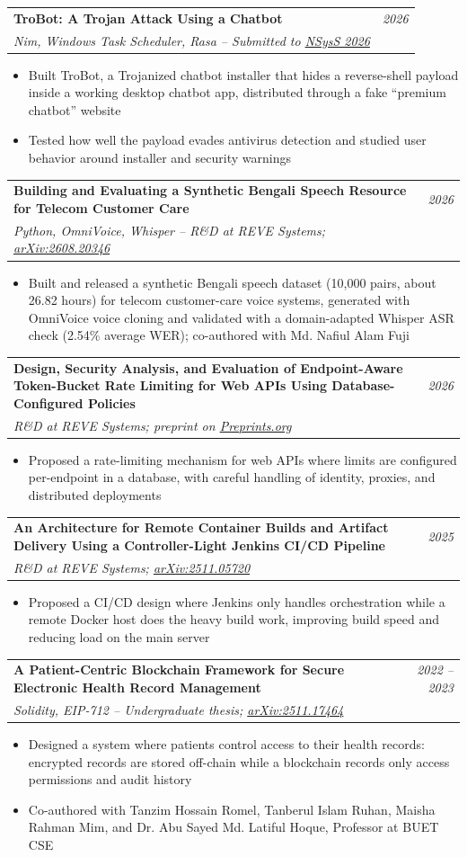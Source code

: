 \documentclass[a4paper,11pt]{article}
\makeatletter
\newcommand{\resumeProject}[4]{
\vspace{0.5mm}\item
    \begin{tabular*}{0.98\textwidth}[t]{@{}p{0.80\textwidth}@{\extracolsep{\fill}}r@{}}
        \textbf{#1} & \textit{\footnotesize{#3}} \\
        \footnotesize{\textit{#2}} & \footnotesize{#4}
    \end{tabular*}
    \vspace{-2.4mm}
}
\newcommand{\resumeItemListStart}{\begin{itemize}[leftmargin=*,labelsep=1mm,itemsep=0.5mm]}
\newcommand{\resumeItemListEnd}{\end{itemize}\vspace{-2mm}}
\makeatother
\begin{document}
\resumeProject
  {TroBot: A Trojan Attack Using a Chatbot}
  {Nim, Windows Task Scheduler, Rasa -- Submitted to \href{https://cse.buet.ac.bd/nsyss2026/}{NSysS 2026}}
  {2026}
  {{}}
\resumeItemListStart
  \item Built TroBot, a Trojanized chatbot installer that hides a reverse-shell payload inside a working desktop chatbot app, distributed through a fake ``premium chatbot'' website
  \item Tested how well the payload evades antivirus detection and studied user behavior around installer and security warnings
\resumeItemListEnd

\resumeProject
  {Building and Evaluating a Synthetic Bengali Speech Resource for Telecom Customer Care}
  {Python, OmniVoice, Whisper -- R\&D at REVE Systems; \href{https://doi.org/10.48550/arXiv.2608.20346}{arXiv:2608.20346}}
  {2026}
  {{}}
\resumeItemListStart
  \item Built and released a synthetic Bengali speech dataset (10,000 pairs, about 26.82 hours) for telecom customer-care voice systems, generated with OmniVoice voice cloning and validated with a domain-adapted Whisper ASR check (2.54\% average WER); co-authored with Md. Nafiul Alam Fuji
\resumeItemListEnd

\resumeProject
  {Design, Security Analysis, and Evaluation of Endpoint-Aware Token-Bucket Rate Limiting for Web APIs Using Database-Configured Policies}
  {R\&D at REVE Systems; preprint on \href{https://www.preprints.org/manuscript/202602.1689}{Preprints.org}}
  {2026}
  {{}}
\resumeItemListStart
  \item Proposed a rate-limiting mechanism for web APIs where limits are configured per-endpoint in a database, with careful handling of identity, proxies, and distributed deployments
\resumeItemListEnd

\resumeProject
  {An Architecture for Remote Container Builds and Artifact Delivery Using a Controller-Light Jenkins CI/CD Pipeline}
  {R\&D at REVE Systems; \href{https://doi.org/10.48550/arXiv.2511.05720}{arXiv:2511.05720}}
  {2025}
  {{}}
\resumeItemListStart
  \item Proposed a CI/CD design where Jenkins only handles orchestration while a remote Docker host does the heavy build work, improving build speed and reducing load on the main server
\resumeItemListEnd

\resumeProject
  {A Patient-Centric Blockchain Framework for Secure Electronic Health Record Management}
  {Solidity, EIP-712 -- Undergraduate thesis; \href{https://doi.org/10.48550/arXiv.2511.17464}{arXiv:2511.17464}}
  {2022 -- 2023}
  {{}}
\resumeItemListStart
  \item Designed a system where patients control access to their health records: encrypted records are stored off-chain while a blockchain records only access permissions and audit history
  \item Co-authored with Tanzim Hossain Romel, Tanberul Islam Ruhan, Maisha Rahman Mim, and Dr. Abu Sayed Md. Latiful Hoque, Professor at BUET CSE
\resumeItemListEnd
\end{document}
